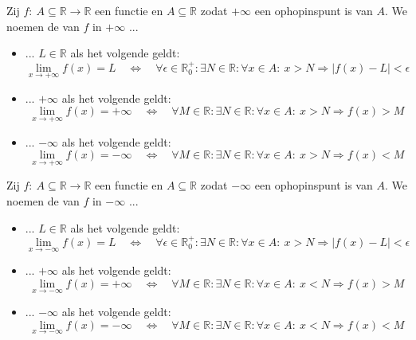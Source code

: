 \documentclass[main.tex]{subfiles}
\begin{document}
\begin{de}
  \label{de:limiet-van-functie-in-plus-oneindig}
  Zij $f:\ A \subseteq \mathbb{R} \rightarrow \mathbb{R}$ een functie en $A \subseteq \mathbb{R}$ zodat $+\infty$ een ophopinspunt is van $A$.
  We noemen de  van $f$ in $+\infty$ ...
  \begin{itemize}
  \item ... $L\in \mathbb{R}$ als het volgende geldt:
    \[
    \lim_{x\rightarrow +\infty}f(x) = L \quad\Leftrightarrow\quad
    \forall \epsilon \in \mathbb{R}_{0}^{+}: \exists N \in \mathbb{R}: \forall x\in A:\ x > N \Rightarrow |f(x) - L| < \epsilon
    \]
  \item ... $+\infty$ als het volgende geldt:
    \[
    \lim_{x\rightarrow +\infty}f(x) = +\infty\quad\Leftrightarrow\quad
    \forall M \in \mathbb{R}: \exists N \in \mathbb{R}: \forall x\in A:\ x > N \Rightarrow f(x) > M
    \]
  \item ... $-\infty$ als het volgende geldt:
    \[
    \lim_{x\rightarrow +\infty}f(x) = -\infty\quad\Leftrightarrow\quad
    \forall M \in \mathbb{R}: \exists N \in \mathbb{R}: \forall x\in A:\ x > N \Rightarrow f(x) < M
    \]
  \end{itemize}
\end{de}

\begin{de}
  \label{de:limiet-van-functie-in-min-oneindig}
  Zij $f:\ A \subseteq \mathbb{R} \rightarrow \mathbb{R}$ een functie en $A \subseteq \mathbb{R}$ zodat $-\infty$ een ophopinspunt is van $A$.
  We noemen de  van $f$ in $-\infty$ ...
  \begin{itemize}
  \item ... $L\in \mathbb{R}$ als het volgende geldt:
    \[
    \lim_{x\rightarrow -\infty}f(x) = L \quad\Leftrightarrow\quad
    \forall \epsilon \in \mathbb{R}_{0}^{+}: \exists N \in \mathbb{R}: \forall x\in A:\ x > N \Rightarrow |f(x) - L| < \epsilon
    \]
  \item ... $+\infty$ als het volgende geldt:
    \[
    \lim_{x\rightarrow -\infty}f(x) = +\infty\quad\Leftrightarrow\quad
    \forall M \in \mathbb{R}: \exists N \in \mathbb{R}: \forall x\in A:\ x < N \Rightarrow f(x) > M
    \]
  \item ... $-\infty$ als het volgende geldt:
    \[
    \lim_{x\rightarrow -\infty}f(x) = -\infty\quad\Leftrightarrow\quad
    \forall M \in \mathbb{R}: \exists N \in \mathbb{R}: \forall x\in A:\ x < N \Rightarrow f(x) < M
    \]
  \end{itemize}
\end{de}
\end{document}
